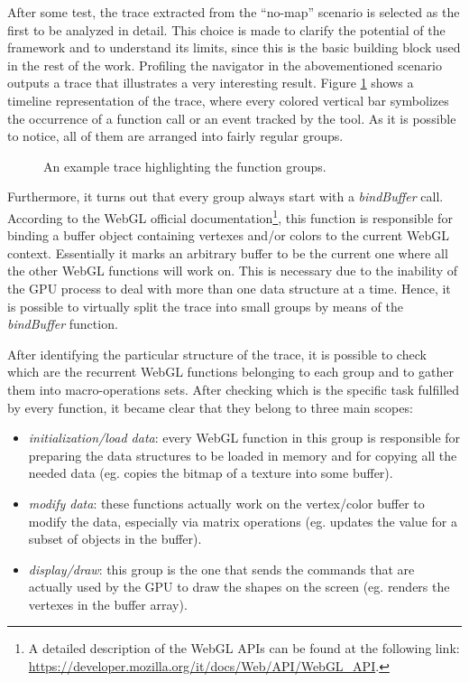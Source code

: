 After some test, the trace extracted from the ``no-map'' scenario
is selected as the first to be analyzed in detail. This choice is made
to clarify the potential of the framework and to understand its limits, since
this is the basic building block used in the rest of the work.
Profiling the navigator in the abovementioned scenario outputs a trace that
illustrates a very interesting result. Figure \ref{img:no_map_overview}
shows a timeline representation of the trace, where every colored vertical bar
symbolizes the occurrence of a function call or an event tracked by the tool.
As it is possible to notice, all of them are arranged into fairly regular groups.
\begin{figure}[!htb]
    \caption{An example trace highlighting the function groups.}
    \label{img:no_map_overview}
\end{figure}

Furthermore, it turns out that every group always start with a \emph{bindBuffer}
call. According to the WebGL official documentation\footnote{A detailed description
of the WebGL APIs can be found at the following link:
\url{https://developer.mozilla.org/it/docs/Web/API/WebGL_API}.}, this function is
responsible for binding a buffer object containing vertexes and/or colors to the
current WebGL context. Essentially it marks an arbitrary buffer to be the current
one where all the other WebGL functions will work on. This is necessary due to the
inability of the GPU process to deal with more than one data structure at a time. Hence,
it is possible to virtually split the trace into small groups by means of the
\emph{bindBuffer} function.

After identifying the particular structure of the trace, it is possible to check
which are the recurrent WebGL functions belonging to each group and to gather them into
macro-operations sets. After checking which is the specific task fulfilled by every
function, it became clear that they belong to three main scopes:
\begin{itemize}
    \item \emph{initialization/load data}: every WebGL function in this group
        is responsible for preparing the data structures to be loaded in memory
        and for copying all the needed data (eg. copies the bitmap of a texture
        into some buffer).
    \item \emph{modify data}: these functions actually work on the vertex/color
        buffer to modify the data, especially via matrix operations (eg. updates
        the value for a subset of objects in the buffer).
    \item \emph{display/draw}: this group is the one that sends the commands
        that are actually used by the GPU to draw the shapes on the screen
        (eg. renders the vertexes in the buffer array).
\end{itemize}

